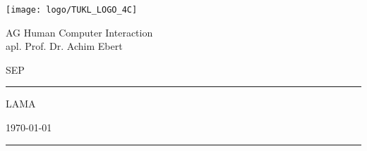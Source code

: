 \thispagestyle{empty}
	\newcommand{\Rule}{\rule{\textwidth}{0.5mm}}
	\begin{center}
	{\Large \texttt{[image: logo/TUKL\_LOGO\_4C]} \par}

	\vspace{0.5em}

	{\Large AG Human Computer Interaction \\ apl. Prof. Dr. Achim Ebert \par}

	\vspace{0.5em}

	{\Large SEP \the\year \par}


	\vspace{5cm}

	\Rule

	\vspace{1cm}

	{\Huge LAMA \par}

	\vspace{0.5em}

	{\Large \mysubject \par}

	\vspace{0.5em}

	{\small \today \par}

	\vspace{0.7cm}

	\Rule


	\vfill %


	\emph{\textbf{\mygroup}} \\[1em]
	\myauthor

	\end{center}
